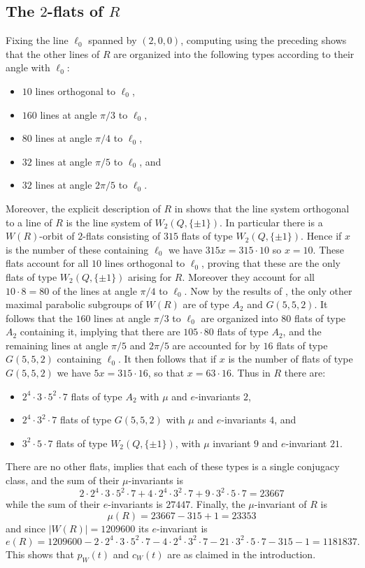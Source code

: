 \documentclass[11pt, reqno]{amsart}
\numberwithin{equation}{section}
\theoremstyle{definition}
\theoremstyle{plain}
\begin{document}
\subsection{The $2$-flats of $R$} Fixing the line $\ell_0$ spanned by $(2,0,0)$, computing using the preceding shows that the other lines of $R$ are organized into the following types according to their angle with $\ell_0$:
\begin{itemize}
\item[(a)] $10$ lines orthogonal to $\ell_0$,
\item[(b)] $160$ lines at angle $\pi/3$ to $\ell_0$,
\item[(c)] $80$ lines at angle $\pi/4$ to $\ell_0$,
\item[(d)] $32$ lines at angle $\pi/5$ to $\ell_0$, and
\item[(e)] $32$ lines at angle $2 \pi /5$ to $\ell_0$.
\end{itemize} Moreover, the explicit description of $R$ in \cite{Coh} shows that the line system orthogonal to a line of $R$ is the line system of $W_2(Q,\{\pm 1\})$. In particular there is a $W(R)$-orbit of $2$-flats consisting of $315$ flats of type $W_2(Q,\{ \pm 1\})$. Hence if $x$ is the number of these containing $\ell_0$ we have $315 x=315 \cdot 10$ so $x=10$. These flats account for all $10$ lines orthogonal to $\ell_0$, proving that these are the only flats of type $W_2(Q,\{\pm 1 \})$ arising for $R$. Moreover they account for all $10 \cdot 8=80$ of the lines at angle $\pi/4$ to $\ell_0$. Now by the results of \cite{BST}, the only other maximal parabolic subgroups of $W(R)$ are of type $A_2$ and $G(5,5,2)$. It follows that the $160$ lines at angle $\pi/3$ to $\ell_0$ are organized into $80$ flats of type $A_2$ containing it, implying that there are $105 \cdot 80$ flats of type $A_2$, and the remaining lines at angle $\pi/5$ and $2 \pi /5$ are accounted for by $16$ flats of type $G(5,5,2)$ containing $\ell_0$. It then follows that if $x$ is the number of flats of type $G(5,5,2)$ we have $5x=315 \cdot 16$, so that $x=63 \cdot 16$. Thus in $R$ there are:
\begin{itemize}
\item[(a)] $2^4 \cdot 3 \cdot 5^2 \cdot 7$ flats of type $A_2$ with $\mu$ and $e$-invariants $2$,
\item[(b)] $2^4 \cdot 3^2 \cdot 7$ flats of type $G(5,5,2)$ with $\mu$ and $e$-invariants $4$, and
\item[(c)] $3^2 \cdot 5 \cdot 7$ flats of type $W_2(Q,\{\pm 1\})$, with $\mu$ invariant $9$ and $e$-invariant $21$.  
\end{itemize} There are no other flats, \cite{BST} implies that each of these types is a single conjugacy class, and the sum of their $\mu$-invariants is 
$$2 \cdot 2^4 \cdot 3 \cdot 5^2 \cdot 7+ 4 \cdot 2^4 \cdot 3^2 \cdot 7+9 \cdot 3^2 \cdot 5 \cdot 7=23667$$ while the sum of their $e$-invariants is $27447$.  Finally, the $\mu$-invariant of $R$ is
$$\mu(R)=23667-315+1=23353$$ and since $|W(R)|=1209600$ its $e$-invariant is
$$e(R)=1209600-2 \cdot 2^4 \cdot 3 \cdot 5^2 \cdot 7-4 \cdot 2^4 \cdot 3^2 \cdot 7-21 \cdot 3^2 \cdot 5 \cdot 7-315-1=1181837.$$ This shows that $p_W(t)$ and $c_W(t)$ are as claimed in the introduction.
\end{document}
